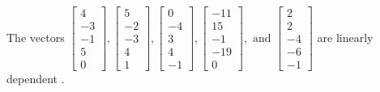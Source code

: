 \begin{exercise}
\begin{exerciseStatement}
  \end{exerciseStatement}
  \begin{exerciseAnswer}
   The vectors \(\left[\begin{array}{r}
4 \\
-3 \\
-1 \\
5 \\
0
\end{array}\right] , \left[\begin{array}{r}
5 \\
-2 \\
-3 \\
4 \\
1
\end{array}\right] , \left[\begin{array}{r}
0 \\
-4 \\
3 \\
4 \\
-1
\end{array}\right] , \left[\begin{array}{r}
-11 \\
15 \\
-1 \\
-19 \\
0
\end{array}\right] , \text{ and } \left[\begin{array}{r}
2 \\
2 \\
-4 \\
-6 \\
-1
\end{array}\right]\) are 
  	 linearly dependent  .
  


  \end{exerciseAnswer}
\end{exercise}